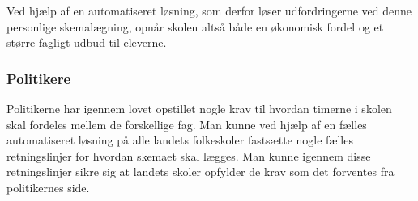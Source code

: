 Ved hjælp af en automatiseret løsning, som derfor løser udfordringerne ved denne personlige skemalægning, opnår skolen altså både en økonomisk fordel og et større fagligt udbud til eleverne.

\subsubsection{Politikere}
Politikerne har igennem lovet opstillet nogle krav til hvordan timerne i skolen skal fordeles mellem de forskellige fag. Man kunne ved hjælp af en fælles automatiseret løsning på alle landets folkeskoler fastsætte nogle fælles retningslinjer for hvordan skemaet skal lægges. Man kunne igennem disse retningslinjer sikre sig at landets skoler opfylder de krav som det forventes fra politikernes side. 

